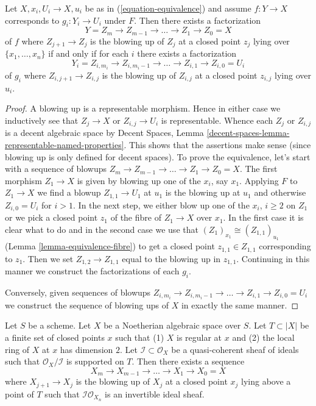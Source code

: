 \begin{lemma}
\label{lemma-equivalence-sequence-blowups}
Let $X, x_i, U_i \to X, u_i$ be as in (\ref{equation-equivalence})
and assume $f : Y \to X$ corresponds to $g_i : Y_i \to U_i$ under $F$.
Then there exists a factorization
$$
Y = Z_m \to Z_{m - 1} \to \ldots \to Z_1 \to Z_0 = X
$$
of $f$ where $Z_{j + 1} \to Z_j$ is the blowing up of $Z_j$ at a closed
point $z_j$ lying over $\{x_1, \ldots, x_n\}$ if and only if for each
$i$ there exists a factorization
$$
Y_i = Z_{i, m_i} \to Z_{i, m_i - 1} \to \ldots \to Z_{i, 1} \to Z_{i, 0} = U_i
$$
of $g_i$ where $Z_{i, j + 1} \to Z_{i, j}$ is the blowing up of $Z_{i, j}$
at a closed point $z_{i, j}$ lying over $u_i$.
\end{lemma}

\begin{proof}
A blowing up is a representable morphism. Hence in either case
we inductively see that $Z_j \to X$ or $Z_{i, j} \to U_i$ is
representable. Whence each $Z_j$ or $Z_{i, j}$ is a decent
algebraic space by Decent Spaces, Lemma
\ref{decent-spaces-lemma-representable-named-properties}.
This shows that the assertions make sense (since blowing up
is only defined for decent spaces).
To prove the equivalence, let's start with a sequence of blowups
$Z_m \to Z_{m - 1} \to \ldots \to Z_1 \to Z_0 = X$.
The first morphism $Z_1 \to X$ is given
by blowing up one of the $x_i$, say $x_1$. Applying $F$
to $Z_1 \to X$ we find a blowup $Z_{1, 1} \to U_1$ at $u_1$
is the blowing up at $u_1$ and otherwise $Z_{i, 0} = U_i$ for $i > 1$.
In the next step, we either blow up one of the $x_i$, $i \geq 2$
on $Z_1$ or we pick a closed point $z_1$ of the fibre of $Z_1 \to X$
over $x_1$. In the first case it is clear what to do and in
the second case we use that $(Z_1)_{x_1} \cong (Z_{1, 1})_{u_1}$
(Lemma \ref{lemma-equivalence-fibre})
to get a closed point $z_{1, 1} \in Z_{1, 1}$ corresponding to $z_1$.
Then we set $Z_{1, 2} \to Z_{1, 1}$ equal to the blowing up
in $z_{1, 1}$. Continuing in this manner we construct the factorizations
of each $g_i$.

\medskip\noindent
Conversely, given sequences of blowups
$Z_{i, m_i} \to Z_{i, m_i - 1} \to \ldots \to Z_{i, 1} \to Z_{i, 0} = U_i$
we construct the sequence of blowing ups of $X$ in exactly the same manner.
\end{proof}

\begin{lemma}
\label{lemma-make-ideal-principal}
Let $S$ be a scheme. Let $X$ be a Noetherian algebraic space over $S$.
Let $T \subset |X|$ be a finite set of closed points $x$ such that
(1) $X$ is regular at $x$ and (2) the local ring of $X$ at $x$ has
dimension $2$. Let $\mathcal{I} \subset \mathcal{O}_X$ be a quasi-coherent
sheaf of ideals such that $\mathcal{O}_X/\mathcal{I}$ is supported on $T$.
Then there exists a sequence
$$
X_m \to X_{m - 1} \to \ldots \to X_1 \to X_0 = X
$$
where $X_{j + 1} \to X_j$ is the blowing up of $X_j$ at a closed
point $x_j$ lying above a point of $T$ such that
$\mathcal{I}\mathcal{O}_{X_n}$ is an invertible ideal sheaf.
\end{lemma}


